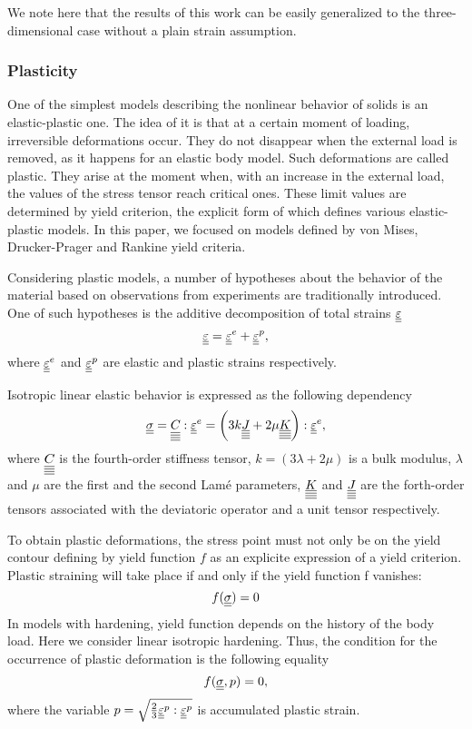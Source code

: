 \documentclass[12pt]{article}
\begin{document}
We note here that the results of this work can be easily generalized to the three-dimensional case without a plain strain assumption.

\subsubsection{Plasticity}

One of the simplest models describing the nonlinear behavior of solids is an elastic-plastic one. The idea of it is that at a certain moment of loading, irreversible deformations occur. They do not disappear when the external load is removed, as it happens for an elastic body model. Such deformations are called plastic. They arise at the moment when, with an increase in the external load, the values of the stress tensor reach critical ones. These limit values are determined by yield criterion, the explicit form of which defines various elastic-plastic models. In this paper, we focused on models defined by von Mises, Drucker-Prager and Rankine yield criteria. 

Considering plastic models, a number of hypotheses about the behavior of the material based on observations from experiments are traditionally introduced. One of such hypotheses is the additive decomposition of total strains $\underline{\underline{\varepsilon}}$
\begin{equation}\label{eqn:eps_dec}
    \underline{\underline{\varepsilon}} = \underline{\underline{\varepsilon}}^e + \underline{\underline{\varepsilon}}^p,
\end{equation}
where $\underline{\underline{\varepsilon}}^e$ and $\underline{\underline{\varepsilon}}^p$ are elastic and plastic strains respectively.

Isotropic linear elastic behavior is expressed as the following dependency
\begin{equation}
    \underline{\underline{\sigma}} = \underline{\underline{\underline{\underline{C_{}}}}} : \underline{\underline{\varepsilon}}^e = \left( 3k\underline{\underline{\underline{\underline{J}}}} + 2\mu\underline{\underline{\underline{\underline{K}}}} \right) : \underline{\underline{\varepsilon}}^e,
\end{equation}
where $\underline{\underline{\underline{\underline{C_{}}}}}$ is the fourth-order stiffness tensor, $k = (3\lambda + 2\mu)$ is a bulk modulus, $\lambda$ and $\mu$ are the first and the second Lamé parameters, $\underline{\underline{\underline{\underline{K}}}}$ and $\underline{\underline{\underline{\underline{J}}}}$ are the forth-order tensors associated with the deviatoric operator and a unit tensor respectively.

To obtain plastic deformations, the stress point must not only be on the yield contour defining by yield function $f$ as an explicite expression of a yield criterion. 
Plastic straining will take place if and only if the yield function f vanishes:
\begin{equation}
    f(\underline{\underline{\sigma}}) = 0
\end{equation}
In models with hardening, yield function depends on the history of the body load. Here we consider linear isotropic hardening. Thus, the condition for the occurrence of plastic deformation is the following equality
\begin{equation}
    f(\underline{\underline{\sigma}}, p) = 0, 
\end{equation}
where the variable $p = \sqrt{\frac{2}{3}\underline{\underline{\varepsilon}}^p : \underline{\underline{\varepsilon}}^p}$ is accumulated plastic strain.
\end{document}
